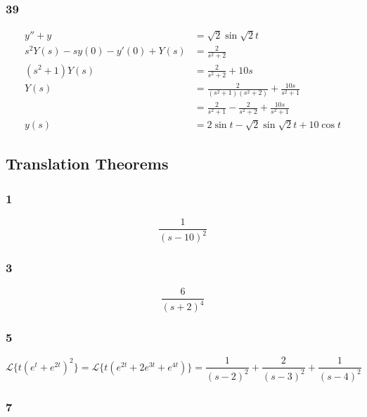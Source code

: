 \documentclass{article}
\begin{document}
\subsubsection{39}

\begin{align*}
  y'' + y                          & = \sqrt{2} \sin \sqrt{2} t                                     \\
  s^2 Y(s) - s y(0) - y'(0) + Y(s) & = \frac{2}{s^2 + 2}                                            \\
  (s^2 + 1) Y(s)                   & = \frac{2}{s^2 + 2} + 10 s                                     \\
  Y(s)                             & = \frac{2}{(s^2 + 1) (s^2 + 2)} + \frac{10 s}{s^2 + 1}         \\
                                   & = \frac{2}{s^2 + 1} - \frac{2}{s^2 + 2} + \frac{10 s}{s^2 + 1} \\
  y(s)                             & = 2 \sin t - \sqrt{2} \sin \sqrt{2} t + 10 \cos t
\end{align*}

\subsection{Translation Theorems}

\subsubsection{1}

\[\frac{1}{(s - 10)^2}\]

\subsubsection{3}

\[\frac{6}{(s + 2)^4}\]

\subsubsection{5}

\[\mathcal{L}\{t (e^t +e^{2 t})^2\} = \mathcal{L}\{ t (e^{2 t} + 2 e^{3 t} + e^{4 t})\} = \frac{1}{(s - 2)^2} + \frac{2}{(s - 3)^2} + \frac{1}{(s - 4)^2}\]

\subsubsection{7}
\end{document}
